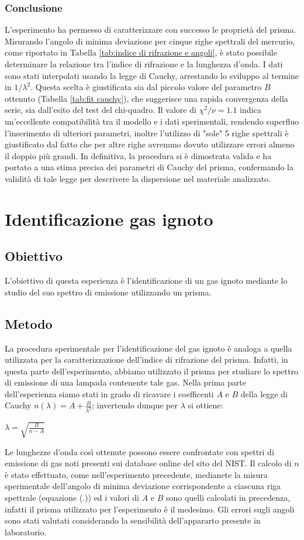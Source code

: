 \documentclass[a4paper]{article}
\begin{document}
\subsubsection{Conclusione}
L'esperimento ha permesso di caratterizzare con successo le proprietà del prisma. Misurando l'angolo di minima deviazione per cinque righe spettrali del mercurio, come riportato in Tabella \ref{tab:indice di rifrazione e angoli}, è stato possibile determinare la relazione tra l'indice di rifrazione e la lunghezza d'onda.
I dati sono stati interpolati usando la legge di Cauchy, arrestando lo sviluppo al termine in $1/\lambda^2$. Questa scelta è giustificata sia dal piccolo valore del parametro $B$ ottenuto (Tabella \ref{tab:fit cauchy}), che suggerisce una rapida convergenza della serie, sia dall'esito del test del chi-quadro. Il valore di $\chi^2/\nu = 1.1$ indica un'eccellente compatibilità tra il modello e i dati sperimentali, rendendo superfluo l'inserimento di ulteriori parametri, inoltre l'utilizzo di "sole" 5 righe spettrali è giustificato dal fatto che per altre righe avremmo dovuto utilizzare errori almeno il doppio più grandi.
In definitiva, la procedura si è dimostrata valida e ha portato a una stima precisa dei parametri di Cauchy del prisma, confermando la validità di tale legge per descrivere la dispersione nel materiale analizzato.

\section{Identificazione gas ignoto}
\subsection{Obiettivo}
L'obiettivo di questa esperienza è l'identificazione di un gas ignoto mediante lo studio del suo spettro di emissione utilizzando un prisma.
\subsection{Metodo} 
La procedura sperimentale per l'identificazione del gas ignoto è analoga a quella utilizzata per la caratterizzazione dell'indice di rifrazione del prisma. Infatti, in questa parte dell'esperimento, abbiamo utilizzato il prisma per studiare lo spettro di emissione di una lampada contenente tale gas. Nella prima parte dell'esperienza siamo stati in grado di ricavare i coefficenti $A$ e $B$ della legge di Cauchy $n(\lambda)=A+\frac{B}{\lambda^2}$; invertendo dunque per $\lambda$ si ottiene:
\begin{center}
    $\lambda=\sqrt{\frac{B}{n-A}}$
    \label{eq: Lambda_gas_ignoto_prisma}
\end{center}
Le lunghezze d'onda così ottenute possono essere confrontate con spettri di emissione di gas noti presenti sui database online del sito del NIST.
Il calcolo di $n$ è stato effettuato, come nell'esperimento precedente, medianete la misura sperimentale dell'angolo di minima deviazione corrispondente a ciascuna riga spettrale (equazione (.)) ed i valori di $A$ e $B$ sono quelli calcolati in precedenza, infatti il prisma utilizzato per l'esperimento è il medesimo.
Gli errori sugli angoli sono stati valutati considerando la sensibilità dell'appararto presente in laboratorio.
\end{document}
